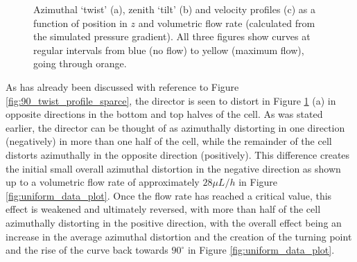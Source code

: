 \begin{figure}
\begin{center}
\end{center}
\caption[Simulated twist, tilt and velocity profiles (uniform state)]{\label{fig:uniform_twist_tilt_profile} Azimuthal `twist' (a), zenith `tilt' (b) and velocity profiles (c) as a function of position in $z$ and volumetric flow rate (calculated from the simulated pressure gradient). All three figures show curves at regular intervals from blue (no flow) to yellow (maximum flow), going through orange.}
\end{figure}

As has already been discussed with reference to Figure \ref{fig:90_twist_profile_sparce}, the director is seen to distort in Figure \ref{fig:uniform_twist_tilt_profile} (a) in opposite directions in the bottom and top halves of the cell. As was stated earlier, the director can be thought of as azimuthally distorting in one direction (negatively) in more than one half of the cell, while the remainder of the cell distorts azimuthally in the opposite direction (positively). This difference creates the initial small overall azimuthal distortion in the negative direction as shown up to a volumetric flow rate of approximately $28 \mu L/h$ in Figure \ref{fig:uniform_data_plot}. Once the flow rate has reached a critical value, this effect is weakened and ultimately reversed, with more than half of the cell azimuthally distorting in the positive direction, with the overall effect being an increase in the average azimuthal distortion and the creation of the turning point and the rise of the curve back towards $90^{\circ}$ in Figure \ref{fig:uniform_data_plot}.

